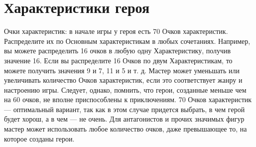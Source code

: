 \section{Характеристики героя}
Очки характеристик: в начале игры у героя есть 70 Очков характеристик. Распределите их по Основным характеристикам в любых сочетаниях. Например, вы можете распределить 16 очков в любую одну Характеристику, получив значение 16. Если вы распределите 16 Очков по двум Характеристикам, то можете получить значения 9 и 7, 11 и 5 и т. д.
\newline Мастер может уменьшать или увеличивать количество Очков характеристик, если это соответствует жанру и настроению игры. Следует, однако, помнить, что герои, созданные меньше чем на 60 очков, не вполне приспособлены к приключениям. 70 Очков характеристик — оптимальный вариант, так как в этом случае придется выбрать, в чем герой будет хорош, а в чем — не очень.
\newline Для антагонистов и прочих значимых фигур мастер может использовать любое количество очков, даже превышающее то, на которое созданы герои.%

